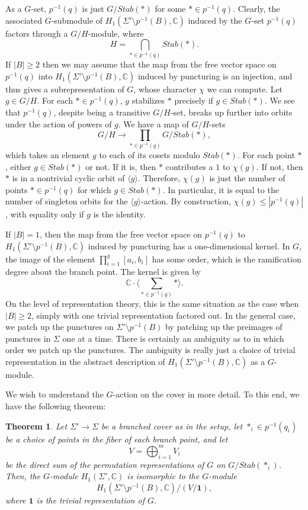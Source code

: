 \documentclass[11pt]{amsart}
\newtheorem{thm}{Theorem}
\numberwithin{thm}{section}
\begin{document}
As a $G$-set, $p^{-1}(q)$ is just $G/Stab(*)$ for some $*\in p^{-1}(q)$.  Clearly, the associated $G$-submodule of $H_1(\Sigma'\setminus p^{-1}(B),{\mathbb{C}})$ induced by the $G$-set $p^{-1}(q)$ factors through a $G/H$-module, where \[H=\bigcap_{*\in p^{-1}(q)} Stab(*).\]  If $|B|\geq 2$ then we may assume that the map from the free vector space on $p^{-1}(q)$ into $H_1(\Sigma'\setminus p^{-1}(B),{\mathbb{C}})$ induced by puncturing is an injection, and thus gives a subrepresentation of $G$, whose character $\chi$ we can compute.  Let $g\in G/H$.  For each $*\in p^{-1}(q)$, $g$ stabilizes $*$ precisely if $g\in Stab(*)$.  We see that $p^{-1}(q)$, despite being a transitive $G/H$-set, breaks up further into orbits under the action of powers of $g$.  We have a map of $G/H$-sets \[G/H\to \prod_{*\in p^{-1}(q)} G/Stab(*),\] which takes an element $g$ to each of its cosets modulo $Stab(*)$.  For each point $*$, either $g\in Stab(*)$ or not.  If it is, then $*$ contributes a $1$ to $\chi(g)$.  If not, then $*$ is in a nontrivial cyclic orbit of $\langle g\rangle$.  Therefore, $\chi(g)$ is just the number of points $*\in p^{-1}(q)$ for which $g\in Stab(*)$.  In particular, it is equal to the number of singleton orbits for the $\langle g\rangle$-action.  By construction, $\chi(g)\leq |p^{-1}(q)|$, with equality only if $g$ is the identity.

If $|B|=1$, then the map from the free vector space on $p^{-1}(q)$ to $H_1(\Sigma'\setminus p^{-1}(B),{\mathbb{C}})$ induced by puncturing has a one-dimensional kernel.  In $G$, the image of the element $\prod_{i=1}^g [a_i,b_i]$ has some order, which is the ramification degree about the branch point.  The kernel is given by \[{\mathbb{C}}\cdot\langle \sum_{*\in p^{-1}(q)} *\rangle.\]  On the level of representation theory, this is the same situation as the case when $|B|\geq 2$, simply with one trivial representation factored out.  In the general case, we patch up the punctures on $\Sigma'\setminus p^{-1}(B)$ by patching up the preimages of punctures in $\Sigma$ one at a time.  There is certainly an ambiguity as to in which order we patch up the punctures.  The ambiguity is really just a choice of trivial representation in the abstract description of $H_1(\Sigma'\setminus p^{-1}(B),{\mathbb{C}})$ as a $G$-module.

We wish to understand the $G$-action on the cover in more detail.  To this end, we have the following theorem:

\begin{thm}
Let $\Sigma'\to\Sigma$ be a branched cover as in the setup, let $*_i\in p^{-1}(q_i)$ be a choice of points in the fiber of each branch point, and let \[V=\bigoplus_{i=1}^m V_i\] be the direct sum of the permutation representations of $G$ on $G/Stab(*_i)$.  Then, the $G$-module $H_1(\Sigma',{\mathbb{C}})$ is isomorphic to the $G$-module \[H_1(\Sigma'\setminus p^{-1}(B),{\mathbb{C}})/(V/\mathbf{1}),\] where $\mathbf{1}$ is the trivial representation of $G$.
\end{thm}
\end{document}
